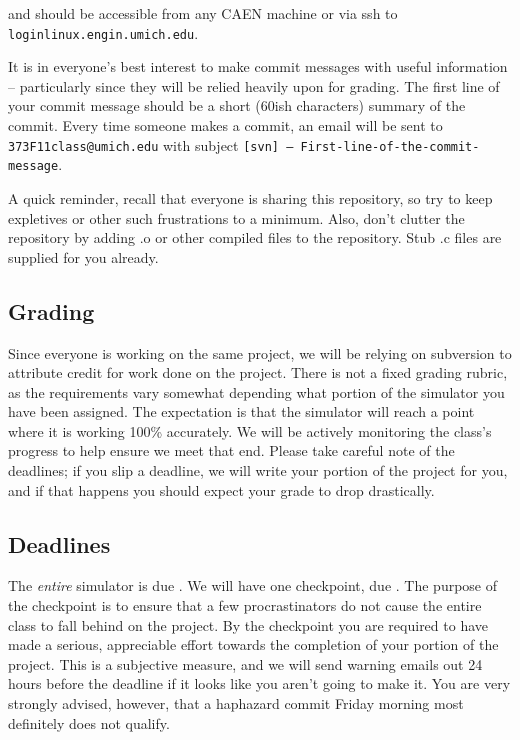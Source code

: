 \documentclass{article}
\begin{document}
and should be accessible
from any CAEN machine or via ssh to {\tt loginlinux.engin.umich.edu}.

It is in everyone's best interest to make commit messages with useful
information -- particularly since they will be relied heavily upon for
grading. The first line of your commit message should be a short (60ish
characters) summary of the commit.
Every time someone makes a commit, an email
will be sent to {\tt 373F11class@umich.edu} with subject {\tt [svn] --
First-line-of-the-commit-message}.

A quick reminder, recall that everyone is sharing this repository, so try to
keep expletives or other such frustrations to a minimum. Also, don't clutter
the repository by adding .o or other compiled files to the repository. Stub .c
files are supplied for you already.

\subsection{Grading}

Since everyone is working on the same project, we will be relying on
subversion to attribute credit for work done on the project. There is not a
fixed grading rubric, as the requirements vary somewhat depending what portion
of the simulator you have been assigned. The expectation is that the simulator
will reach a point where it is working 100\% accurately. We will be actively
monitoring the class's progress to help ensure we meet that end. Please take
careful note of the deadlines; if you slip a deadline, we will write your
portion of the project for you, and if that happens you should expect your
grade to drop drastically.

\subsection{Deadlines}

The {\em entire} simulator is due \duedate. We will have one checkpoint, due
\checkptdate. The purpose of the checkpoint is to ensure that a few
procrastinators do not cause the entire class to fall behind on the project.
By the checkpoint you are required to have made a serious, appreciable effort
towards the completion of your portion of the project. This is a subjective
measure, and we will send warning emails out 24 hours before the deadline if
it looks like you aren't going to make it. You are very strongly advised,
however, that a haphazard commit Friday morning most definitely does not
qualify.
\end{document}
